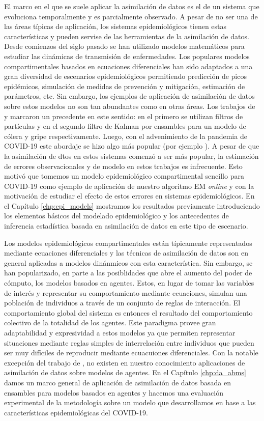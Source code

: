El marco en el que se suele aplicar la asimilación de datos es el de un sistema que evoluciona temporalmente y es parcialmente observado. A pesar de no ser una de las áreas típicas de aplicación, los sistemas epidemiológicos tienen estas características y pueden servise de las herramientas de la asimilación de datos. Desde comienzos del siglo pasado se han utilizado modelos matemáticos para estudiar las dinámicas de transmisión de enfermedades. Los populares modelos compartimentales basados en ecuaciones diferenciales \citep{Kermack1927} han sido adaptados a una gran diversidad de escenarios epidemiológicos permitiendo predicción de picos epidémicos, simulación de medidas de prevención y mitigación, estimación de parámetros, etc. Sin embargo, los ejemplos de aplicación de asimilación de datos sobre estos modelos no son tan abundantes como en otras áreas. Los trabajos de \cite{Ionides2006} y \cite{Shaman2012} marcaron un precedente en este sentido: en el primero se utilizan filtros de partículas y en el segundo filtro de Kalman por ensambles para un modelo de cólera y gripe respectivamente. Luego, con el advenimiento de la pandemia de COVID-19 este abordaje se hizo algo más popular (por ejemplo \cite{Evensen2020, Li2020}). A pesar de que la asimilación de dtos en estos sistemas comenzó a ser más popular, la estimación de errores observacionales y de modelo en estos trabajos es infrecuente. Esto motivó que  tomemos un modelo epidemiológico compartimental sencillo para COVID-19 como ejemplo de aplicación de nuestro algoritmo EM \textit{online} y con la motivación de estudiar el efecto de estos errores en sistemas epidemiológicos. En el Capítulo \ref{chp:epi_models} mostramos los resultados previamente introduciendo los elementos básicos del modelado epidemiológico y los antecedentes de inferencia estadística basada en asimilación de datos en este tipo de escenario.

Los modelos epidemiológicos compartimentales están típicamente representados mediante ecuaciones diferenciales y las técnicas de asimilación de datos son en general aplicadas a modelos dinánmicos con esta característica. Sin embargo, se han popularizado, en parte a las posiblidades que abre el aumento del poder de cómputo, los modelos basados en agentes. Estos, en lugar de tomar las variables de interés y representar su comportamiento mediante ecuaciones, simulan una población de individuos a través de un conjunto de reglas de interacción. El comportamiento global del sistema es entonces el resultado del comportamiento colectivo de la totalidad de los agentes. Este paradigma provee gran adaptabilidad y expresividad a estos modelos ya que permiten representar situaciones mediante reglas simples de interrelación entre individuos que pueden ser muy difíciles de reproducir mediante ecuacuiones diferenciales. Con la notable excepción del trabajo de \cite{Ward2016}, no existen en nuestro conocimiento aplicaciones de asimilación de datos sobre modelos de agentes. En el Capítulo \ref{chp:da_abms} damos un marco general de aplicación de asimilación de datos basada en ensambles para modelos basados en agentes y hacemos una evaluación experimental de la metodología sobre un modelo que desarrollamos en base a las características epidemiológicas del COVID-19.

